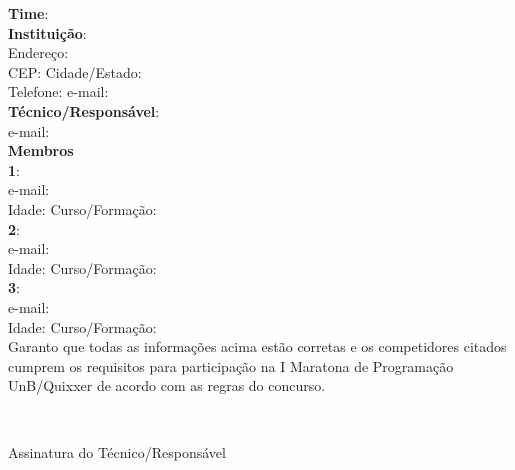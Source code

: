 \documentclass{UnBExam}%
\newcommand{\campo}[2][: ]{#2#1\hrulefill}%
\newcommand{\ca}[1]{\campo{\textbf{#1}}}%
\newcommand{\membro}[1]{%
\indent\ca{#1}\\
\indent\campo{e-mail}\\
\indent\campo{Idade} \campo{Curso/Formação}\\
}%
\begin{document}
%
\vspace{0.5in}
\noindent
\ca{Time}\\
\ca{Instituição}\\
\indent\campo{Endereço}\\
\indent\campo{CEP} \campo{Cidade/Estado}\\
\indent\campo{Telefone} \campo{e-mail}\\
\ca{Técnico/Responsável}\\
\indent\campo{e-mail}\\
\textbf{Membros}\\
\membro{1}%
\membro{2}%
\membro{3}%

\noindent Garanto que todas as informações acima estão corretas e os competidores citados
cumprem os requisitos para participação na I Maratona de Programação UnB/Quixxer de
acordo com as regras do concurso.

\vspace{\baselineskip}
\hspace{.5\textwidth}\hrulefill\\
\strut\hfill Assinatura do Técnico/Responsável
\vfill
\end{document}
